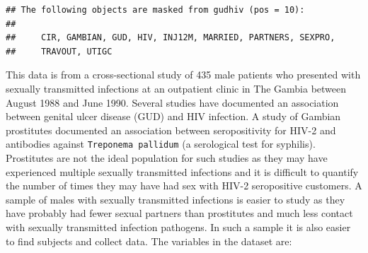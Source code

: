 \documentclass[12pt,]{book}
\theoremstyle{definition}
\theoremstyle{definition}
\theoremstyle{definition}
\theoremstyle{remark}
\begin{document}
\begin{verbatim}
## The following objects are masked from gudhiv (pos = 10):
## 
##     CIR, GAMBIAN, GUD, HIV, INJ12M, MARRIED, PARTNERS, SEXPRO,
##     TRAVOUT, UTIGC
\end{verbatim}

This data is from a cross-sectional study of 435 male patients who
presented with sexually transmitted infections at an outpatient clinic
in The Gambia between August 1988 and June 1990. Several studies have
documented an association between genital ulcer disease (GUD) and HIV
infection. A study of Gambian prostitutes documented an association
between seropositivity for HIV-2 and antibodies against
\texttt{Treponema\ pallidum} (a serological test for syphilis).
Prostitutes are not the ideal population for such studies as they may
have experienced multiple sexually transmitted infections and it is
difficult to quantify the number of times they may have had sex with
HIV-2 seropositive customers. A sample of males with sexually
transmitted infections is easier to study as they have probably had
fewer sexual partners than prostitutes and much less contact with
sexually transmitted infection pathogens. In such a sample it is also
easier to find subjects and collect data. The variables in the dataset
are:
\end{document}
